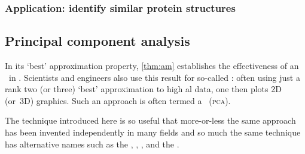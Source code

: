 




\begin{draft}
\subsubsection {Application: identify similar protein structures}
\label{sec:aicps}

\begin{comment}
As an exercise or an application could introduce the Kabsch algorithm (Wikipedia) for calculating the optimal rotation matrix that minimizes the root mean squared deviation between two paired sets of points.  It is useful in graphics, cheminformatics to compare molecular structures, and also bioinformatics for comparing protein structures.
\end{comment}

\end{draft}




\subsection{Principal component analysis}
\label{sec:pca}


In its `best' approximation property, \autoref{thm:am} establishes the effectiveness of an \svd\ in .
Scientists and engineers also use this result for so-called : often using just a rank two (or three) `best' approximation to high al data, one then plots 2D (or~3D) graphics.
Such an approach is often termed a ~(\textsc{pca}).

The technique introduced here is so useful that more-or-less the same approach has been invented independently in many fields and so much the same technique has alternative names such as the , , , and the .


\begin{comment}
 \cite[\S8.4]{Chartier2015}
\end{comment}




